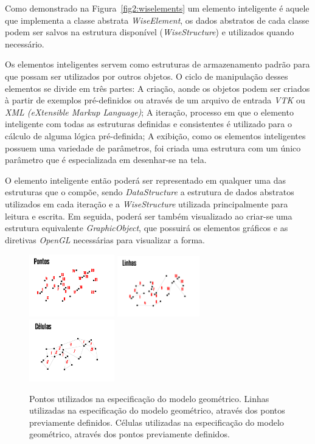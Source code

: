 \documentclass[
        english,			
        brazil			        %
        ,<...>]{abntbibufjf}
\begin{document}
 Como demonstrado na Figura~\ref{fig2:wiselements} um elemento inteligente é aquele que implementa a classe abstrata \textit{WiseElement}, os dados abstratos de cada classe podem ser salvos na estrutura disponível (\textit{WiseStructure}) e utilizados quando necessário. 
 
 Os elementos inteligentes servem como estruturas de armazenamento padrão para que possam ser utilizados por outros objetos. O ciclo de manipulação desses elementos se divide em três partes: A criação, aonde os objetos podem ser criados à partir de exemplos pré-definidos ou através de um arquivo de entrada \textit{VTK} ou \textit{XML (eXtensible Markup Language)}; A iteração, processo em que o elemento inteligente com todas as estruturas definidas e consistentes é utilizado para o cálculo de alguma lógica pré-definida; A exibição,  como os elementos inteligentes possuem uma variedade de parâmetros, foi criada uma estrutura com um único parâmetro que é especializada em desenhar-se na tela.
 
O elemento inteligente então poderá ser representado em qualquer uma das estruturas que o compõe, sendo \textit{DataStructure} a estrutura de dados abstratos utilizados em cada iteração e a \textit{WiseStructure} utilizada principalmente para leitura e escrita. Em seguida, poderá ser também visualizado ao criar-se uma estrutura equivalente \textit{GraphicObject}, que possuirá os elementos gráficos e as diretivas \textit{OpenGL} necessárias para visualizar a forma.

\begin{figure}[!htbp]
	\includegraphics[width=0.33\textwidth]{Figures/WiseElementPoints.png}
	\includegraphics[width=0.32\textwidth]{Figures/WiseElementLines.png}
	\includegraphics[width=0.33\textwidth]{Figures/WiseElementCells.png}
	\caption{Pontos utilizados na especificação do modelo geométrico. Linhas utilizadas na especificação do modelo geométrico, através dos pontos previamente definidos. Células utilizadas na especificação do modelo geométrico, através dos pontos previamente definidos.}
	\label{fig2:wiselementstructs}
\end{figure}
\end{document}

